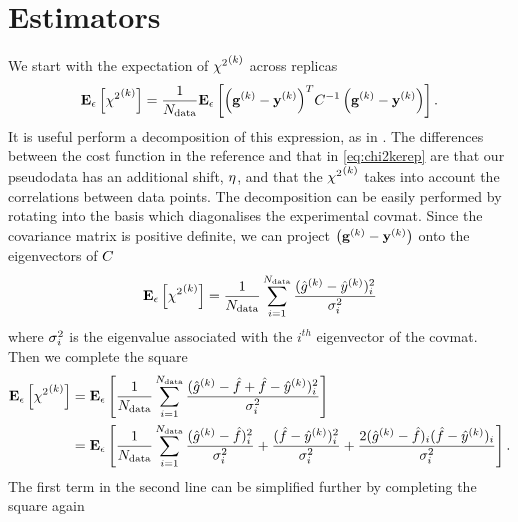\section{Estimators}

We start with the expectation of ${\chi^2}^{(k)}$ across replicas
\begin{equation}
    \label{eq:chi2kerep}
    \mathbf{E}_{\epsilon}\left[ {\chi^2}^{(k)} \right] = \frac{1}{N_{\rm data}} 
    \mathbf{E}_{\epsilon}\left[  {\left( \mathbf{g}^{(k)} - \mathbf{y}^{(k)} \right)}^{T} C^{-1}_{} \left( \mathbf{g}^{(k)} - \mathbf{y}^{(k)} \right) \right].
\end{equation}
It is useful perform a decomposition of this expression, as in \cite{mlforphysics}.
The differences between the cost function in the reference and that in
\eqref{eq:chi2kerep} are that our pseudodata has an additional shift, $\eta$,
and that the ${\chi^2}^{(k)}$ takes into account the correlations between data points.
The decomposition can be easily performed by rotating into the basis which
diagonalises the experimental covmat. Since the covariance matrix is positive
definite, we can project $\left( \mathbf{g}^{(k)} - \mathbf{y}^{(k)} \right)$ onto the eigenvectors of $C$
\begin{equation}
    \mathbf{E}_{\epsilon}\left[ {\chi^2}^{(k)} \right] = \frac{1}{N_{\rm data}} \sum_{i=1}^{N_{\rm data}} \frac{(\hat{g}^{(k)} - \hat{y}^{(k)})_i^2}{\sigma^{2}_i}
\end{equation}
where $\sigma^{2}_i$ is the eigenvalue associated with the $i^{th}$ eigenvector of
the covmat. Then we complete the square
\begin{equation}\label{eq:chi2decomp1}
    \begin{split}
        \mathbf{E}_{\epsilon}\left[ {\chi^2}^{(k)} \right] &=
        \mathbf{E}_{\epsilon}\left[ \frac{1}{N_{\rm data}} \sum_{i=1}^{N_{\rm data}}
            \frac{
                (\hat{g}^{(k)} - \hat{f} + \hat{f} - \hat{y}^{(k)})_i^2
            }{\sigma^{2}_i}  \right] \\
        &= \mathbf{E}_{\epsilon}\left[ \frac{1}{N_{\rm data}} \sum_{i=1}^{N_{\rm data}}
            \frac{(\hat{g}^{(k)} - \hat{f})^2_i}{\sigma^{2}_i} +
            \frac{(\hat{f} - \hat{y}^{(k)})_i^2}{\sigma^{2}_i} +
            \frac{2(\hat{g}^{(k)} - \hat{f})_i(\hat{f} - \hat{y}^{(k)})_i}{\sigma^{2}_i} \right].
    \end{split}
\end{equation}
The first term in the second line can be simplified further by completing the
square again
